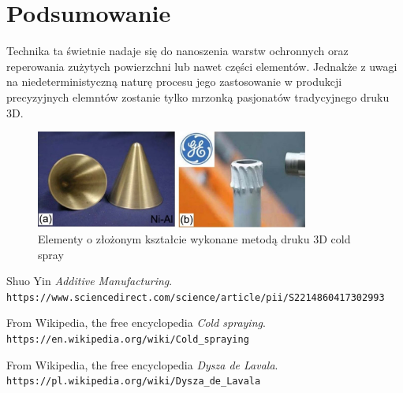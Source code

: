 \documentclass[13pt]{article}
\begin{document}
\section{Podsumowanie}
Technika ta świetnie nadaje się do nanoszenia warstw ochronnych oraz reperowania zużytych powierzchni lub nawet części elementów. Jednakże z uwagi na niedeterministyczną naturę procesu jego zastosowanie w produkcji precyzyjnych elemntów zostanie tylko mrzonką pasjonatów tradycyjnego druku 3D.

\begin{figure}[!h]
	\centering
	\includegraphics[width=0.8\textwidth]{res.jpg}
	\caption{ Elementy o złożonym kształcie wykonane metodą druku 3D cold spray \cite{additive}}
\end{figure}
\begin{thebibliography}{9}
Shuo Yin
\textit{Additive Manufacturing}. 
\\\texttt{https://www.sciencedirect.com/science/article/pii/S2214860417302993}


From Wikipedia, the free encyclopedia
\textit{Cold spraying}. 
\\\texttt{https://en.wikipedia.org/wiki/Cold\_spraying}

From Wikipedia, the free encyclopedia
\textit{Dysza de Lavala}. 
\\\texttt{https://pl.wikipedia.org/wiki/Dysza\_de\_Lavala}
\end{thebibliography}
\end{document}
